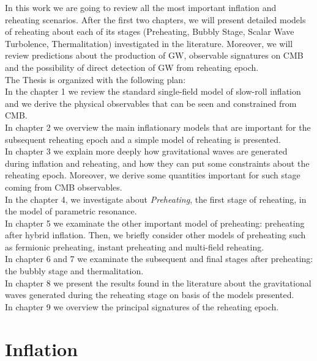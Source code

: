 \documentclass[11pt,a4paper,twoside]{book}
\begin{document}
In this work we are going to review all the most important inflation and reheating scenarios. After the first two chapters, we will present detailed models of reheating about each of its stages (Preheating, Bubbly Stage, Scalar Wave Turbolence, Thermalitation) investigated in the literature. Moreover, we will review predictions about the production of GW, observable signatures on CMB and the possibility of direct detection of GW from reheating epoch.\\
The Thesis is organized with the following plan:\\
In the chapter 1 we review the standard single-field model of slow-roll inflation and we derive the physical observables that can be seen and constrained from CMB. \\
In chapter 2 we overview the main inflationary models that are important for the subsequent reheating epoch and a simple model of reheating is presented.\\ In chapter 3 we explain more deeply how gravitational waves are generated during inflation and reheating, and how they can put some constraints about the reheating epoch. Moreover, we derive some quantities important for such stage coming from CMB observables.\\
In the chapter 4, we investigate about \textit{Preheating}, the first stage of reheating, in the model of parametric resonance. \\
In  chapter 5 we examinate the other important model of preheating: preheating after hybrid inflation. Then, we briefly consider other models of preheating such as fermionic preheating, instant preheating and multi-field reheating.\\
In  chapter 6 and 7 we examinate the subsequent and final stages after preheating: the bubbly stage and thermalitation.\\
In chapter 8 we present the results found in the literature about the gravitational waves generated during the reheating stage on basis of the models presented.\\
In chapter 9 we  overview the principal signatures  of the reheating epoch.
 
 \mainmatter
 
\chapter{Inflation}
\end{document}
